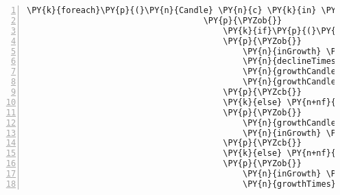 \begin{Verbatim}[commandchars=\\\{\},numbers=left,firstnumber=1,stepnumber=1,numberblanklines=0]
                                    \PY{k}{foreach}\PY{p}{(}\PY{n}{Candle} \PY{n}{c} \PY{k}{in} \PY{n}{candles}\PY{p}{)}
                                    \PY{p}{\PYZob{}}
                                        \PY{k}{if}\PY{p}{(}\PY{n}{c}\PY{p}{.}\PY{n}{Close} \PY{p}{\PYZgt{}} \PY{n}{c}\PY{p}{.}\PY{n}{Open} \PY{p}{\PYZam{}}\PY{p}{\PYZam{}} \PY{n}{inGrowth} \PY{p}{=}\PY{p}{=} \PY{k}{false}\PY{p}{)}
                                        \PY{p}{\PYZob{}}
                                            \PY{n}{inGrowth} \PY{p}{=} \PY{k}{true}\PY{p}{;}
                                            \PY{n}{declineTimes}\PY{p}{.}\PY{n}{Add}\PY{p}{(}\PY{n}{growthCandles}\PY{p}{.}\PY{n}{Last}\PY{p}{(}\PY{p}{)}\PY{p}{.}\PY{n}{Time}\PY{p}{.}\PY{n}{Subtract}\PY{p}{(}\PY{n}{growthCandles}\PY{p}{.}\PY{n}{First}\PY{p}{(}\PY{p}{)}\PY{p}{.}\PY{n}{Time}\PY{p}{)}\PY{p}{)}\PY{p}{;}
                                            \PY{n}{growthCandles}\PY{p}{.}\PY{n}{Clear}\PY{p}{(}\PY{p}{)}\PY{p}{;}
                                            \PY{n}{growthCandles}\PY{p}{.}\PY{n}{Add}\PY{p}{(}\PY{n}{c}\PY{p}{)}\PY{p}{;}
                                        \PY{p}{\PYZcb{}}
                                        \PY{k}{else} \PY{n+nf}{if}\PY{p}{(}\PY{p}{(}\PY{n}{c}\PY{p}{.}\PY{n}{Close} \PY{p}{\PYZgt{}} \PY{n}{c}\PY{p}{.}\PY{n}{Open} \PY{p}{\PYZam{}}\PY{p}{\PYZam{}} \PY{n}{inGrowth} \PY{p}{=}\PY{p}{=} \PY{k}{true}\PY{p}{)} \PY{p}{|}\PY{p}{|} \PY{p}{(}\PY{n}{c}\PY{p}{.}\PY{n}{Close} \PY{p}{\PYZgt{}} \PY{n}{c}\PY{p}{.}\PY{n}{Open} \PY{p}{\PYZam{}}\PY{p}{\PYZam{}} \PY{n}{inGrowth} \PY{p}{=}\PY{p}{=} \PY{k}{null}\PY{p}{)}\PY{p}{)}
                                        \PY{p}{\PYZob{}}
                                            \PY{n}{growthCandles}\PY{p}{.}\PY{n}{Add}\PY{p}{(}\PY{n}{c}\PY{p}{)}\PY{p}{;}
                                            \PY{n}{inGrowth} \PY{p}{=} \PY{k}{true}\PY{p}{;}
                                        \PY{p}{\PYZcb{}}
                                        \PY{k}{else} \PY{n+nf}{if}\PY{p}{(}\PY{n}{c}\PY{p}{.}\PY{n}{Close} \PY{p}{\PYZlt{}} \PY{n}{c}\PY{p}{.}\PY{n}{Open} \PY{p}{\PYZam{}}\PY{p}{\PYZam{}} \PY{n}{inGrowth} \PY{p}{=}\PY{p}{=} \PY{k}{true}\PY{p}{)}
                                        \PY{p}{\PYZob{}}
                                            \PY{n}{inGrowth} \PY{p}{=} \PY{k}{false}\PY{p}{;}
                                            \PY{n}{growthTimes}\PY{p}{.}\PY{n}{Add}\PY{p}{(}\PY{n}{growthCandles}\PY{p}{.}\PY{n}{Last}\PY{p}{(}\PY{p}{)}\PY{p}{.}\PY{n}{Time}\PY{p}{.}\PY{n}{Subtract}\PY{p}{(}\PY{n}{growthCandles}\PY{p}{.}\PY{n}{First}\PY{p}{(}\PY{p}{)}\PY{p}{.}\PY{n}{Time}\PY{p}{)}\PY{p}{)}\PY{p}{;}

\end{Verbatim}
